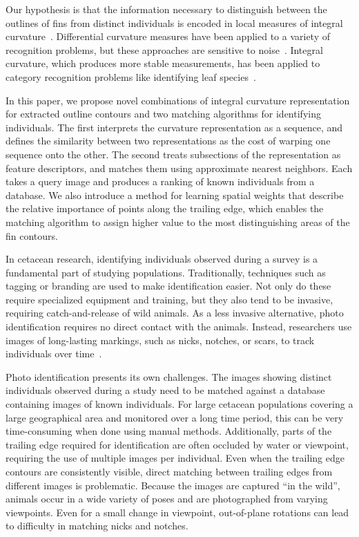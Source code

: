 \documentclass[10pt,twocolumn,letterpaper]{article}
\begin{document}
Our hypothesis is that the information necessary to distinguish between the
outlines of fins from distinct individuals is encoded in local measures of
integral curvature~\cite{Jablons16}.  Differential curvature measures have been applied to a
variety of recognition problems, but these approaches are sensitive to
noise~\cite{Pottmann09}.  Integral curvature, which produces more stable
measurements, has been applied to category recognition problems like
identifying leaf species~\cite{Kumar12}.

In this paper, we propose novel combinations of integral curvature
representation for extracted outline contours and two matching algorithms for
identifying individuals.  The first interprets the curvature representation as
a sequence, and defines the similarity between two representations as the cost
of warping one sequence onto the other.  The second treats subsections of the
representation as feature descriptors, and matches them using approximate
nearest neighbors.  Each takes a query image and produces a ranking of known
individuals from a database.  We also introduce a method for learning spatial
weights that describe the relative importance of points along the trailing
edge, which enables the matching algorithm to assign higher value to the most
distinguishing areas of the fin contours.

In cetacean research, identifying individuals observed during a survey is a
fundamental part of studying populations.  Traditionally, techniques such as
tagging or branding are used to make identification easier.  Not only do these
require specialized equipment and training, but they also tend to be invasive,
requiring catch-and-release of wild animals.  As a less invasive alternative,
photo identification requires no direct contact with the animals. Instead,
researchers use images of long-lasting markings, such as nicks, notches, or
scars, to track individuals over time~\cite{Wells90, Hammond90}.

Photo identification presents its own challenges. The images showing distinct
individuals observed during a study need to be matched against a database
containing images of known individuals.  For large cetacean populations
covering a large geographical area and monitored over a long time period, this
can be very time-consuming when done using manual methods.  Additionally, parts
of the trailing edge required for identification are often occluded by water or
viewpoint, requiring the use of multiple images per individual.  Even when the
trailing edge contours are consistently visible, direct matching between
trailing edges from different images is problematic.  Because the images are
captured ``in the wild'', animals occur in a wide variety of poses and are
photographed from varying viewpoints.  Even for a small change in viewpoint,
out-of-plane rotations can lead to difficulty in matching nicks and notches.
\end{document}
